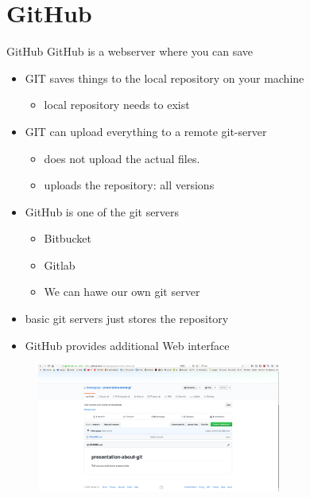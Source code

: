 \documentclass[aspectratio=169]{beamer}
\begin{document}
\section{GitHub}

\begin{frame}

\begin{block}{GitHub}
GitHub is a webserver where you can save 
\end{block}

\begin{itemize}
\item GIT saves things to the local repository on your machine
	\begin{itemize}
		\item local repository needs to exist
	\end{itemize}
\pause
\item GIT can upload everything to a remote git-server
	\begin{itemize}
		\item does not upload the actual files.
		\item uploads the repository: all versions
	\end{itemize}
\pause
	
\item GitHub is one of the git servers
	\begin{itemize}
		\item Bitbucket
		\item Gitlab
		\item We can hawe our own git server 
	\end{itemize}
\end{itemize}
 
\end{frame}




\begin{frame}


\begin{itemize}
\item basic git servers just stores the repository
\item GitHub provides additional Web interface
\end{itemize}


\begin{figure}[ht]
\centering
\includegraphics[height=120pt]{pictures/Screenshot_2020-02-25_14-38-35.png}
\end{figure}

 
\end{frame}
\end{document}
